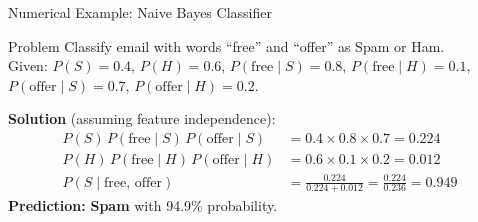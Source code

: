 \begin{frame}{Numerical Example: Naive Bayes Classifier}
\begin{exampleblock}{Problem}
Classify email with words ``free'' and ``offer'' as Spam or Ham.\\
Given: $P(S)=0.4$, $P(H)=0.6$, $P(\text{free}\mid S)=0.8$, $P(\text{free}\mid H)=0.1$,\\
$P(\text{offer}\mid S)=0.7$, $P(\text{offer}\mid H)=0.2$.
\end{exampleblock}
\textbf{Solution} (assuming feature independence):
\begin{align*}
P(S)\,P(\text{free}\mid S)\,P(\text{offer}\mid S) &= 0.4 \times 0.8 \times 0.7 = \mathbf{0.224}\\
P(H)\,P(\text{free}\mid H)\,P(\text{offer}\mid H) &= 0.6 \times 0.1 \times 0.2 = \mathbf{0.012}\\[4pt]
P(S\mid\text{free, offer}) &= \frac{0.224}{0.224+0.012} = \frac{0.224}{0.236} = \mathbf{0.949}
\end{align*}
\textbf{Prediction:} \textbf{Spam} with 94.9\% probability.
\end{frame}
